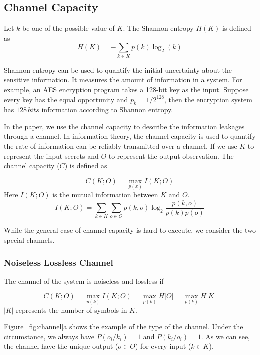 \subsection{Channel Capacity}
Let $k$ be one of the possible
value of $K$. The Shannon entropy $H(K)$ is defined as
\begin{equation}\label{eq1}
    H(K) = - \sum_{k {\in} K}p(k)\log_2(k)
\end{equation}

Shannon entropy can be used to quantify the initial uncertainty about the sensitive information. It measures the amount of information in a system. For example, an AES encryption program takes a 128-bit key as the input. Suppose every key has the equal opportunity and $p_k = 1/ 2^{128}$, then the encryption system has $128 \, \mathit{bits}$ information according to Shannon entropy. 


In the paper, we use the channel capacity to describe the information leakages through a channel. In information theory, the channel capacity is used to quantify the rate of information can be reliably transmitted over a channel. If we use $K$ to represent the input secrets and $O$ to represent the output observation. The channel capacity ($C$) is defined as 

\begin{equation}\label{eq2}
C(K;O) = \max_{p(x)} I(K;O)
\end{equation}
Here $I(K;O)$ is the mutual information between $K$ and $O$.  
\begin{equation} \label{eq3}
    I(K;O) = \sum_{k {\in} K}{\sum_{o {\in} O}{p(k, o)\log_2\frac{p(k, o)}{p(k)p(o)}}}
\end{equation}

While the general case of channel capacity is hard to execute, we consider the two special channels.

\subsubsection{Noiseless Lossless Channel}
The channel of the system is noiseless and lossless if

\begin{equation} \label{eq:1}
    C(K;O) = \max_{p(k)} I(K;O) = \max_{p(k)} H|O| =\max_{p(k)} H|K|
\end{equation}
$|K|$ represents the number of symbols in $K$. 

Figure~\ref{fig:channel}a shows the example of the type of the channel. Under the circumstance, we always have $P(o_i/k_i) = 1$ and $P(k_i/o_i) = 1$. As we can see, the channel have the unique output ($o \in O$) for every input ($k \in K$). 

